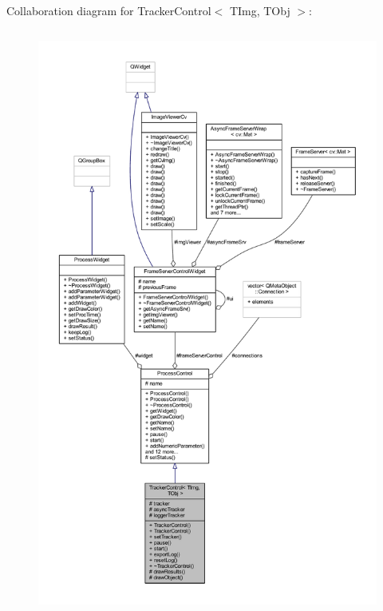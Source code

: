 Collaboration diagram for Tracker\+Control$<$ T\+Img, T\+Obj $>$\+:
\nopagebreak
\begin{figure}[H]
\begin{center}
\leavevmode
\includegraphics[height=550pt]{class_tracker_control__coll__graph}
\end{center}
\end{figure}
